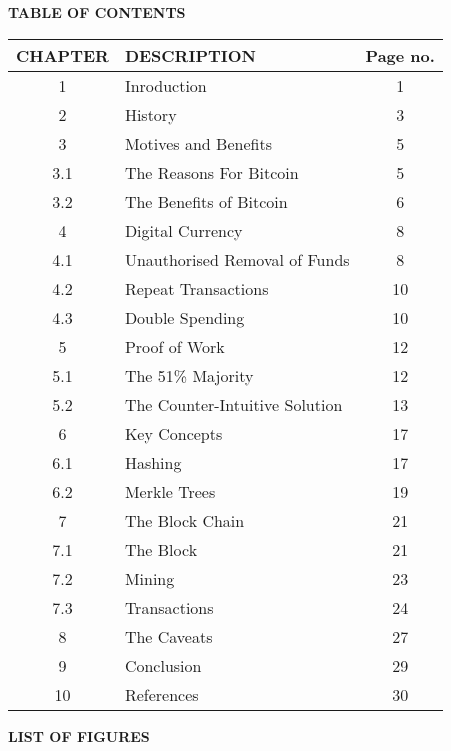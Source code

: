 \documentclass[12pt,a4paper]{report}
\newcommand{\blank}[1]{\hspace*{#1}}
\begin{document}
\begin{flushleft}
\newpage

\begin{center}\Large\textbf{TABLE OF CONTENTS}\end{center}
\vspace{10mm}

\begin{tabular}{|c |l| c|}\hline
\textbf{CHAPTER} & DESCRIPTION\blank{7cm} & \textbf{Page no.}\\ \hline
1 & Inroduction & 1\\ \hline
2 & History &3\\ \hline
3 & Motives and Benefits & 5\\ \hline
3.1 &  The Reasons For Bitcoin &5\\ \hline
3.2 &  The Benefits of Bitcoin & 6\\ \hline
4 &  Digital Currency & 8\\ \hline
4.1 &  Unauthorised Removal of Funds & 8\\ \hline
4.2 & Repeat Transactions & 10\\ \hline
4.3 & Double Spending & 10 \\ \hline
5 & Proof of Work & 12\\ \hline
5.1 & The 51\% Majority & 12\\ \hline
5.2 & The Counter-Intuitive Solution & 13\\ \hline
6 & Key Concepts & 17\\ \hline

6.1 & Hashing & 17 \\ \hline
6.2 & Merkle Trees & 19 \\ \hline
7 & The Block Chain & 21 \\ \hline
7.1 & The Block & 21 \\ \hline
7.2 & Mining & 23 \\ \hline
7.3 & Transactions & 24 \\ \hline
8 & The Caveats & 27 \\ \hline
9 & Conclusion & 29 \\ \hline
10 & References & 30 \\ \hline
\end{tabular}

\newpage

\begin{center}\Large\textbf{LIST OF FIGURES}\end{center}

\vspace{10mm}


\end{flushleft}
\end{document}
